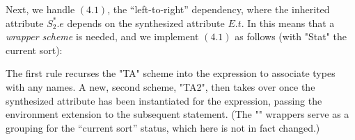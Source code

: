 \documentclass[11pt]{article} %
\begin{document}
\begin{example}
  Next, we handle $(4.1)$, the ``left-to-right'' dependency, where the inherited attribute $S^*_2.e$
  depends on the synthesized attribute $E.t$. In \HAX this means that a \emph{wrapper scheme} is
  needed, and we implement $(4.1)$ as follows (with "Stat" the current sort):
  The first rule recurses the "TA" scheme into the expression to associate types with any names. A
  new, second scheme, "TA2", then takes over once the synthesized attribute has been instantiated
  for the expression, passing the environment extension to the subsequent statement.  (The "{}"
  wrappers serve as a grouping for the ``current sort'' status, which here is not in fact changed.)


\end{example}
\end{document}

